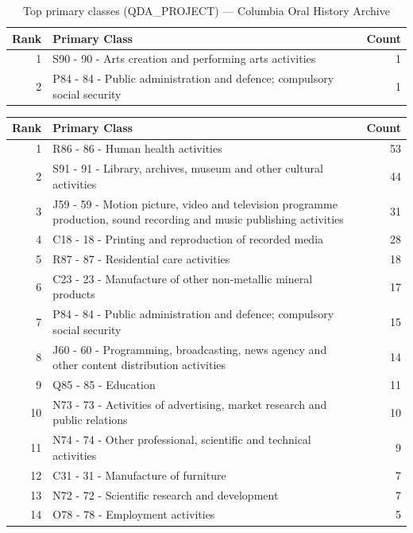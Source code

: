 \begin{table}[H]
    \centering
    \begin{tabular}{r p{10cm} r}
    \hline
    \textbf{Rank} & \textbf{Primary Class} & \textbf{Count} \\
    \hline
    1 & S90 - 90 - Arts creation and performing arts activities & 1 \\
    2 & P84 - 84 - Public administration and defence; compulsory social security & 1 \\
    \hline
    \end{tabular}
    \caption{Top primary classes (QDA\_PROJECT) --- Columbia Oral History Archive}
\end{table}

\begin{table}[H]
    \centering
    \begin{tabular}{r p{10cm} r}
    \hline
    \textbf{Rank} & \textbf{Primary Class} & \textbf{Count} \\
    \hline
    1 & R86 - 86 - Human health activities & 53 \\
    2 & S91 - 91 - Library, archives, museum and other cultural activities & 44 \\
    3 & J59 - 59 - Motion picture, video and television programme production, sound recording and music publishing activities & 31 \\
    4 & C18 - 18 - Printing and reproduction of recorded media & 28 \\
    5 & R87 - 87 - Residential care activities & 18 \\
    6 & C23 - 23 - Manufacture of other non-metallic mineral products & 17 \\
    7 & P84 - 84 - Public administration and defence; compulsory social security & 15 \\
    8 & J60 - 60 - Programming, broadcasting, news agency and other content distribution activities & 14 \\
    9 & Q85 - 85 - Education & 11 \\
    10 & N73 - 73 - Activities of advertising, market research and public relations & 10 \\
    11 & N74 - 74 - Other professional, scientific and technical activities & 9 \\
    12 & C31 - 31 - Manufacture of furniture & 7 \\
    13 & N72 - 72 - Scientific research and development & 7 \\
    14 & O78 - 78 - Employment activities & 5 \\

\end{tabular}
\end{table}
